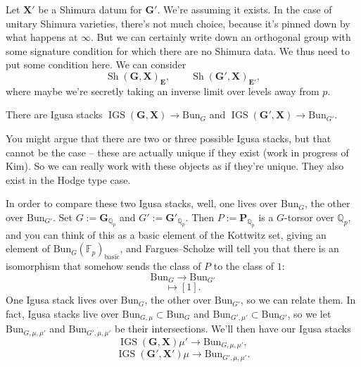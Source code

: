 \documentclass[reqno]{amsart} 
\begin{document}
Let $\mathbf{X} '$ be a Shimura datum for $\mathbf{G}'$.  We're assuming it exists.  In the case of unitary Shimura varieties, there's not much choice, because it's pinned down by what happens at $\infty$.  But we can certainly write down an orthogonal group with some signature condition for which there are no Shimura data.  We thus need to put some condition here.
We can consider
\begin{equation*}
  \operatorname{Sh}(\mathbf{G}, \mathbf{X})_{\mathbf{E}}, \qquad
  \operatorname{Sh}(\mathbf{G} ', \mathbf{X} )_{\mathbf{E} '},
\end{equation*}
where maybe we're secretly taking an inverse limit over levels away from $p$.
\begin{conjecture}[Scholze]
  There are Igusa stacks $\operatorname{IGS}(\mathbf{G}, \mathbf{X}) \rightarrow \mathrm{Bun}_{G}$ and $\operatorname{IGS}(\mathbf{G} ', \mathbf{X}) \rightarrow \mathrm{Bun}_{G'}$.
\end{conjecture}

You might argue that there are two or three possible Igusa stacks, but that cannot be the case -- these are actually unique if they exist (work in progress of Kim).  So we can really work with these objects as if they're unique.  They also exist in the Hodge type case.

In order to compare these two Igusa stacks, well, one lives over $\mathrm{Bun}_G$, the other over $\mathrm{Bun}_{G'}$.  Set $G := \mathbf{G}_{\mathbb{Q}_p}$ and $G' := \mathbf{G} '_{\mathbb{Q}_p}$.  Then $P := \mathbf{P}_{\mathbb{Q}_p}$ is a $G$-torsor over $\mathbb{Q}_p$, and you can think of this as a basic element of the Kottwitz set, giving an element of $\mathrm{Bun}_G(\mathbb{F}_p)_{\mathrm{basic}}$, and Fargues--Scholze will tell you that there is an isomorphism that somehow sends the class of $P$ to the class of $1$:
\begin{equation*}
  \mathrm{Bun}_G \rightarrow \mathrm{Bun}_{G '}
\end{equation*}
\begin{equation*}
  [P] \mapsto [1].
\end{equation*}
One Igusa stack lives over $\mathrm{Bun}_G$, the other over $\mathrm{Bun}_{G'}$, so we can relate them.  In fact, Igusa stacks live over $\mathrm{Bun}_{G, \mu} \subset \mathrm{Bun}_G$ and $\mathrm{Bun}_{G', \mu '} \subset \mathrm{Bun}_{G'}$, so we let $\mathrm{Bun}_{G, \mu, \mu '}$ and $\mathrm{Bun}_{G', \mu, \mu '}$ be their intersections.  We'll then have our Igusa stacks
\begin{equation*}
  \operatorname{IGS}(\mathbf{G}, \mathbf{X}) \mu '
  \rightarrow
  \mathrm{Bun}_{G, \mu, \mu '},
\end{equation*}
\begin{equation*}
  \operatorname{IGS}(\mathbf{G}', \mathbf{X}') \mu
  \rightarrow
  \mathrm{Bun}_{G', \mu, \mu '}.
\end{equation*}
\end{document}
